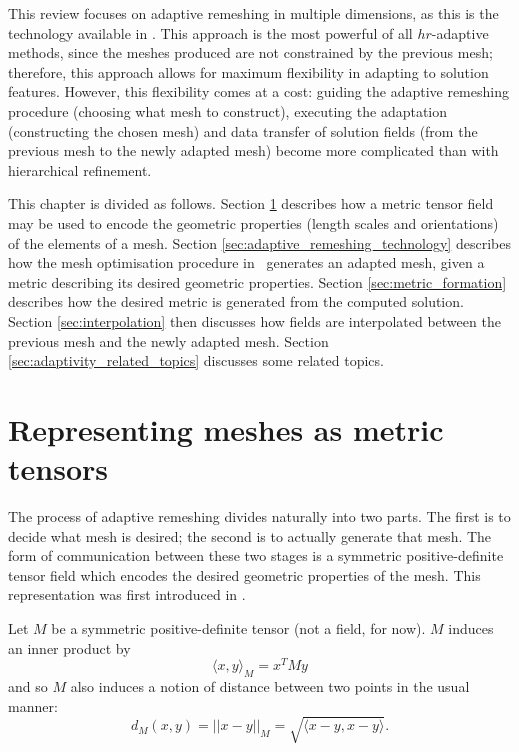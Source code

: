 This review focuses on adaptive remeshing in multiple dimensions, as this is
the technology available in \fluidity.
This approach is the most powerful of all $hr$-adaptive methods, since the meshes produced are not constrained
by the previous mesh; therefore, this approach allows for maximum flexibility in
adapting to solution features. However, this flexibility comes
at a cost: guiding the adaptive remeshing procedure (choosing
what mesh to construct), executing the adaptation (constructing
the chosen mesh) and data transfer of solution fields (from the previous mesh to
the newly adapted mesh) become more complicated than with hierarchical refinement.

This chapter is divided as follows. Section \ref{sec:meshes_and_metrics} describes how a metric tensor field
may be used to encode the geometric properties (length scales and orientations) of the
elements of a mesh. Section \ref{sec:adaptive_remeshing_technology} describes how the
mesh optimisation procedure in \fluidity\ generates an adapted mesh, given a metric
describing its desired geometric properties. Section \ref{sec:metric_formation}
describes how the desired metric is generated from the computed solution. Section
\ref{sec:interpolation} then discusses how fields are interpolated between the
previous mesh and the newly adapted mesh. Section \ref{sec:adaptivity_related_topics}
discusses some related topics.

\section{Representing meshes as metric tensors} \label{sec:meshes_and_metrics}
The process of adaptive remeshing divides naturally into two parts. The first is to
decide what mesh is desired; the second is to actually generate that mesh. The form
of communication between these two stages is a symmetric positive-definite tensor field
which encodes the desired geometric properties of the mesh. This representation was first introduced
in \citet{vallet1990}.

Let $M$ be a symmetric positive-definite tensor (not a field, for now).
$M$ induces an inner product by
\begin{equation}
\langle x, y\rangle_M = x^T M y
\end{equation}
and so $M$ also induces a notion of distance between two points in the usual manner:
\begin{equation}
d_M(x, y) = ||x - y||_M = \sqrt{\langle x - y, x - y \rangle}.
\end{equation}

